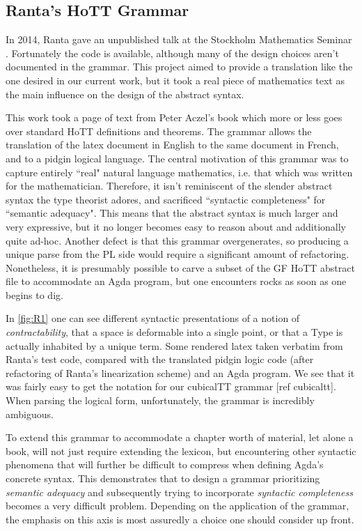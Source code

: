 \subsection{Ranta's HoTT Grammar}

In 2014, Ranta gave an unpublished talk at the Stockholm Mathematics Seminar
\cite{aarneHott}. Fortunately the code is available, although many of the design
choices aren't documented in the grammar. This project aimed to provide a
translation like the one desired in our current work, but it took a real piece
of mathematics text as the main influence on the design of the abstract syntax.

This work took a page of text from Peter Aczel's book which more or less goes
over standard HoTT definitions and theorems. The grammar allows the translation
of the latex document in English to the same document in French, and to a pidgin
logical language. The central motivation of this grammar was to capture entirely
``real" natural language mathematics, i.e. that which was written for the
mathematician. Therefore, it isn't reminiscent of the slender abstract syntax
the type theorist adores, and sacrificed ``syntactic completeness" for
``semantic adequacy". This means that the abstract syntax is much larger and
very expressive, but it no longer becomes easy to reason about and additionally
quite ad-hoc. Another defect is that this grammar overgenerates, so producing a
unique parse from the PL side would require a significant amount of refactoring.
Nonetheless, it is presumably possible to carve a subset of the
GF HoTT abstract file to accommodate an Agda program, but one encounters rocks
as soon as one begins to dig.

In \autoref{fig:R1} one can see different syntactic presentations of a notion of
\emph{contractability}, that a space is deformable into a single point, or that a Type
is actually inhabited by a unique term. Some rendered latex taken verbatim from
Ranta's test code, compared with the translated pidgin logic code (after
refactoring of Ranta's linearization scheme) and an Agda program. We see that it was
fairly easy to get the notation for our cubicalTT grammar [ref cubicaltt].
When parsing the logical form, unfortunately, the grammar is incredibly ambiguous.



To extend this grammar to accommodate a chapter worth of material, let alone a
book, will not just require extending the lexicon, but encountering other
syntactic phenomena that will further be difficult to compress when defining
Agda's concrete syntax. This demonstrates that to design a grammar prioritizing
\emph{semantic adequacy} and subsequently trying to incorporate \emph{syntactic
completeness} becomes a very difficult problem. Depending on the application of
the grammar, the emphasis on this axis is most assuredly a choice one should
consider up front.

